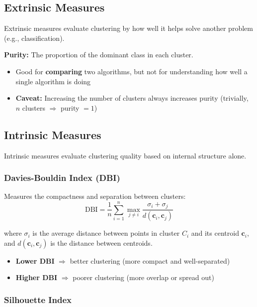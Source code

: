 \documentclass[11pt,a4paper]{article}
\theoremstyle{definition}
\theoremstyle{plain}
\theoremstyle{remark}
\begin{document}
\subsection{Extrinsic Measures}

Extrinsic measures evaluate clustering by how well it helps solve another problem (e.g., classification).

\textbf{Purity:} The proportion of the dominant class in each cluster.
\begin{itemize}
    \item Good for \textbf{comparing} two algorithms, but not for understanding how well a single algorithm is doing
    \item \textbf{Caveat:} Increasing the number of clusters always increases purity (trivially, $n$ clusters $\Rightarrow$ purity $= 1$)
\end{itemize}

\subsection{Intrinsic Measures}

Intrinsic measures evaluate clustering quality based on internal structure alone.

\subsubsection{Davies-Bouldin Index (DBI)}

Measures the compactness and separation between clusters:
\[
\text{DBI} = \frac{1}{n} \sum_{i=1}^{n} \max_{j \neq i} \frac{\sigma_i + \sigma_j}{d(\mathbf{c}_i, \mathbf{c}_j)}
\]

where $\sigma_i$ is the average distance between points in cluster $C_i$ and its centroid $\mathbf{c}_i$, and $d(\mathbf{c}_i, \mathbf{c}_j)$ is the distance between centroids.

\begin{itemize}
    \item \textbf{Lower DBI} $\Rightarrow$ better clustering (more compact and well-separated)
    \item \textbf{Higher DBI} $\Rightarrow$ poorer clustering (more overlap or spread out)
\end{itemize}

\subsubsection{Silhouette Index}
\end{document}
